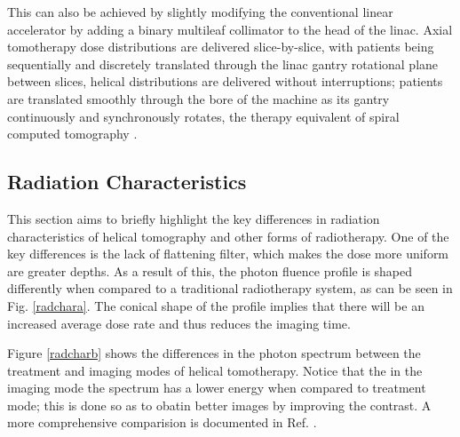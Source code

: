\documentclass[10pt,journal,compsoc]{IEEEtran} %
\begin{document}
  This can also be achieved by slightly modifying the conventional linear 
  accelerator by adding a binary multileaf collimator to the head of the linac. 
  Axial tomotherapy dose distributions are delivered slice-by-slice, with 
  patients being sequentially and discretely translated through the linac 
  gantry rotational plane between slices, helical distributions are delivered 
  without interruptions; patients are translated smoothly through the bore of 
  the machine as its gantry continuously and synchronously rotates, the 
  therapy equivalent of spiral computed tomography \cite{Fenwick2006}. 
  \subsection{Radiation Characteristics}
  \label{radiation}
  This section aims to briefly highlight the key differences in radiation 
  characteristics of helical tomography and other forms of radiotherapy. One of 
  the key differences is the lack of flattening filter, which makes the dose 
  more uniform are greater depths. As a result of this, the photon fluence 
  profile is shaped differently when compared to a traditional radiotherapy 
  system, as can be seen in Fig. \ref{radchara}. The conical shape of the 
  profile implies that there will be an increased average dose rate and thus 
  reduces the imaging time. 
  
  Figure \ref{radcharb} shows the differences in the photon spectrum between 
  the 
  treatment and imaging modes of helical tomotherapy. Notice that the in the 
  imaging mode the spectrum has a lower energy when compared to treatment mode; 
  this is done so as to obatin better images by improving the contrast. A more 
  comprehensive comparision is documented in Ref. \cite{Jeraj2004}.
  
\end{document}
